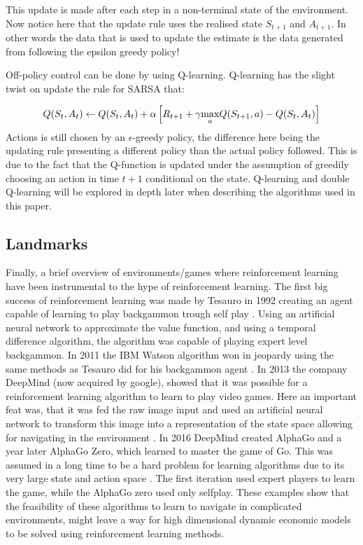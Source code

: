 This update is made after each step in a non-terminal state of the environment. 
Now notice here that the update rule uses the realised state $S_{t+1}$ and $A_{t+1}$. In other words the data that is used to update the estimate is the data generated from following the epsilon greedy policy! 

Off-policy control can be done by using Q-learning. Q-learning has the slight twist on update the rule for SARSA that:

\begin{equation}
    Q(S_t, A_t) \leftarrow Q(S_t, A_t) + \alpha \left[ R_{t+1} + \gamma \underset{a}{\max} Q(S_{t + 1}, a) - Q(S_t, A_t) \right] 
\end{equation}
Actions is still chosen by an $\epsilon$-greedy policy, the difference here being the updating rule presenting a different policy than the actual policy followed. This is due to the fact that the Q-function is updated under the assumption of greedily choosing an action in time $t+1$ conditional on the state. Q-learning and double Q-learning will be explored in depth later when describing the algorithms used in this paper.

\subsection{Landmarks}

Finally, a brief overview of environments/games where reinforcement learning have been instrumental to the hype of reinforcement learning. The first big success of reinforcement learning was made by Tesauro in 1992 creating an agent capable of learning to play backgammon trough self play \parencite{sutton_reinforcement_2018}. Using an artificial neural network to approximate the value function, and using a temporal difference algorithm, the algorithm was capable of playing expert level backgammon. In 2011 the IBM Watson algorithm won in jeopardy using the same methods as Tesauro did for his backgammon agent \parencite{sutton_reinforcement_2018}. In 2013 the company DeepMind (now acquired by google), showed that it was possible for a reinforcement learning algorithm to learn to play video games. Here an important feat was, that it was fed the raw image input and used an artificial neural network to transform this image into a representation of the state space allowing for navigating in the environment \parencite{mnih_playing_2013}. In 2016 DeepMind created AlphaGo and a year later AlphaGo Zero, which learned to master the game of Go. This was assumed in a long time to be a hard problem for learning algorithms due to its very large state and action space \parencite{silver_general_2018}. The first iteration used expert players to learn the game, while the AlphaGo zero used only selfplay. These examples show that the feasibility of these algorithms to learn to navigate in complicated environments, might leave a way for high dimensional dynamic economic models to be solved using reinforcement learning methods.
